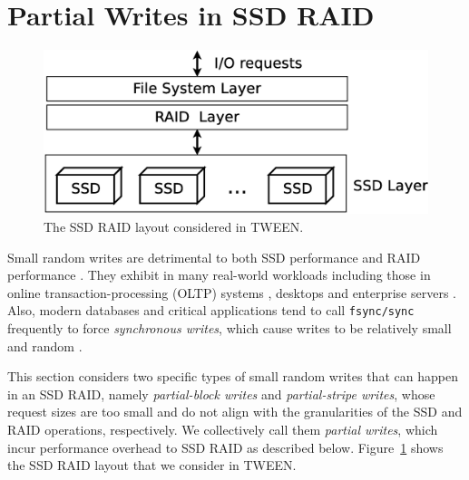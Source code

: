 \section{Partial Writes in SSD RAID}
\label{sec:partial}

\begin{figure}[t]
\centering
\includegraphics[width=0.7\linewidth]{figs/typical_raid}
\caption{The SSD RAID layout considered in TWEEN.}
\label{fig:typicalraid}
\end{figure}

Small random writes are detrimental to both SSD performance
\cite{kim08,chen09,min12} and RAID performance \cite{stodolsky93}.  They exhibit
in many real-world workloads including those in online transaction-processing
(OLTP) systems \cite{wong02}, desktops \cite{harter11} and enterprise servers
\cite{kavalanekar08}. Also, modern databases and critical applications tend to
call \texttt{fsync/sync} frequently to force {\em synchronous writes}, which
cause writes to be relatively small and random \cite{harter11}.
	   
	
This section considers two specific types of small random writes that can happen
in an SSD RAID, namely {\em partial-block writes} and {\em partial-stripe
    writes}, whose request sizes are too small and do not align with the
granularities of the SSD and RAID operations, respectively. We collectively call
them {\em partial writes}, which incur performance overhead to SSD RAID as
described below.  Figure~\ref{fig:typicalraid} shows the SSD RAID layout that we
consider in TWEEN.



